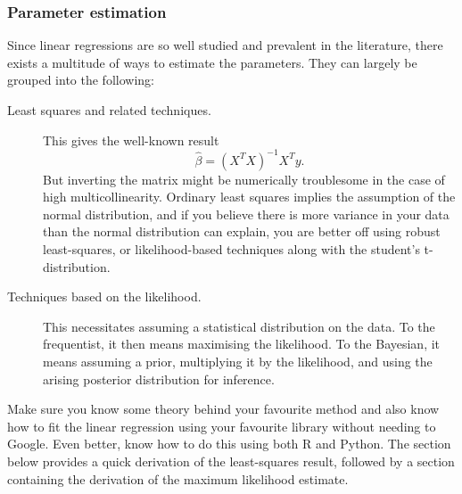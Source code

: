 \documentclass[a4paper]{article}
\begin{document}
\subsubsection{Parameter estimation}
Since linear regressions are so well studied and prevalent in the literature, there exists a multitude of ways to estimate the parameters.
They can largely be grouped into the following:
\begin{description}
  \item[Least squares and related techniques.] This gives the well-known result
  \[
    \hat{\beta} = (X^T X)^{-1}X^T y
    \text{.}
  \]
  But inverting the matrix might be numerically troublesome in the case of high multicollinearity.
  Ordinary least squares implies the assumption of the normal distribution, and if you believe there is more variance in your data than the normal distribution can explain, you are better off using robust least-squares, or likelihood-based techniques along with the student's t-distribution.
  \item[Techniques based on the likelihood.]
  This necessitates assuming a statistical distribution on the data.
  To the frequentist, it then means maximising the likelihood.
  To the Bayesian, it means assuming a prior, multiplying it by the likelihood, and using the arising posterior distribution for inference.
\end{description}
Make sure you know some theory behind your favourite method and also know how to fit the linear regression using your favourite library without needing to Google.
Even better, know how to do this using both R and Python.
The section below provides a quick derivation of the least-squares result, followed by a section containing the derivation of the maximum likelihood estimate.
\end{document}
